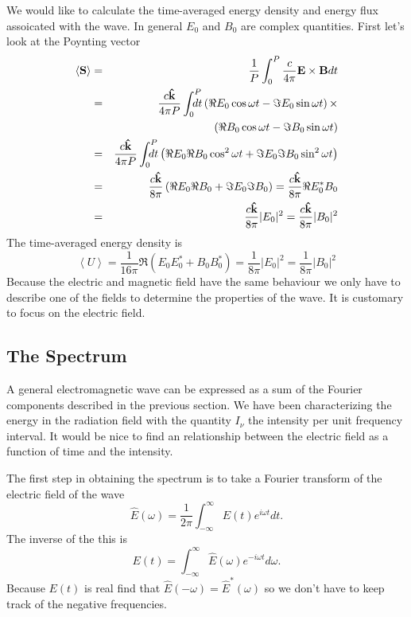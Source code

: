 We would like to calculate the time-averaged energy density and energy
flux assoicated with the wave.  In general $E_0$ and $B_0$ are complex
quantities.  First let's look at the Poynting vector
\begin{eqnarray}
\left < {\bf S} \right > &=& \frac{1}{P} \int_0^P
\frac{c}{4\pi} {\bf E \times B} d t \\
&=& \frac{c{\bf \hat k}}{4\pi P} \int_0^P \!\!\!\!\!\!
d t
 \left ( \Re E_0 \cos \omega t 
- \Im E_0 \sin \omega t \right ) \times \nonumber \\ & & ~~~ \left ( \Re B_0 \cos \omega t 
- \Im B_0 \sin \omega t \right )   \\
&=&  \frac{c{\bf \hat k}}{4\pi P} \int_0^P \!\!\!\!\!\!
d t
 \left ( \Re E_0 \Re B_0 \cos^2 \omega t + \Im E_0 \Im B_0 \sin^2
 \omega t \right ) \\
&=&  \frac{c{\bf \hat k}}{8\pi} 
 \left ( \Re E_0 \Re B_0 + \Im E_0 \Im B_0 \right ) =
\frac{c{\bf \hat k}}{8\pi} \Re E_0^* B_0 \\
&=& \frac{c{\bf \hat k}}{8\pi} |E_0|^2= \frac{c{\bf \hat k}}{8\pi} |B_0|^2
\label{eq:146}
\end{eqnarray}
The time-averaged energy density is
\begin{equation}
\left < U \right > = \frac{1}{16\pi} \Re \left ( E_0 E_0^* + B_0 B_0^*
\right ) = \frac{1}{8\pi} |E_0|^2 = \frac{1}{8\pi} |B_0|^2
\label{eq:147}
\end{equation}
Because the electric and magnetic field have the same behaviour we
only have to describe one of the fields to determine the properties of the
wave.  It is customary to focus on the electric field.

\subsection{The Spectrum}
\label{sec:spectrum}
 A general electromagnetic wave can be
expressed as a sum of the Fourier components described in the previous
section.  We have been characterizing the energy in the radiation
field with the quantity $I_\nu$ the intensity per unit frequency
interval.  It would be nice to find an relationship between the
electric field as a function of time and the intensity.

The first step in obtaining the spectrum is to take a Fourier
transform of the electric field of the wave
\begin{equation}
{\hat E} (\omega) = \frac{1}{2\pi} \int_{-\infty}^{\infty} E(t)
e^{i\omega t} d t.
\label{eq:148}
\end{equation}
The inverse of the this is
\begin{equation}
E (t) =  \int_{-\infty}^{\infty} {\hat E}(\omega)
e^{-i\omega t} d \omega.
\label{eq:149}
\end{equation}
Because $E(t)$ is real find that ${\hat E}(-\omega)={\hat
  E}^*(\omega)$ so we don't have to keep track of the negative
frequencies.

